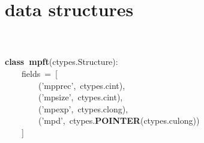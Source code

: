 \documentclass{article}\usepackage[]{graphicx}\usepackage[dvipsnames,table]{xcolor}
\makeatletter
\newcommand{\hlsng}[1]{\textcolor[rgb]{0.192,0.494,0.8}{#1}}%
\newcommand{\hlopt}[1]{\textcolor[rgb]{0,0,0}{#1}}%
\newcommand{\hldef}[1]{\textcolor[rgb]{0.345,0.345,0.345}{#1}}%
\newcommand{\hlkwa}[1]{\textcolor[rgb]{0.161,0.373,0.58}{\textbf{#1}}}%
\newcommand{\hlkwd}[1]{\textcolor[rgb]{0.737,0.353,0.396}{\textbf{#1}}}%
\newenvironment{kframe}{%
 \def\at@end@of@kframe{}%
 \ifinner\ifhmode%
  \def\at@end@of@kframe{\end{minipage}}%
  \begin{minipage}{\columnwidth}%
 \fi\fi%
 \def\FrameCommand##1{\hskip\@totalleftmargin \hskip-\fboxsep
 \colorbox{shadecolor}{##1}\hskip-\fboxsep
     \hskip-\linewidth \hskip-\@totalleftmargin \hskip\columnwidth}%
 \MakeFramed {\advance\hsize-\width
   \@totalleftmargin\z@ \linewidth\hsize
   \@setminipage}}%
 {\par\unskip\endMakeFramed%
 \at@end@of@kframe}
\newenvironment{knitrout}{}{} %
\makeatother
\begin{document}
\section{data structures}
\begin{center}
\begin{minipage}[m]{15cm}
\begin{knitrout}\small
{}\color{fgcolor}\begin{kframe}
\noindent
\ttfamily
\hldef{}\hspace*{\fill}\\
\hldef{}\hspace*{\fill}\\
\hldef{}\hlkwa{class\ }\hldef{}\hlkwd{mpf\textunderscore t}\hldef{}\hlopt{(}\hldef{ctypes}\hlopt{.}\hldef{Structure}\hlopt{):}\hspace*{\fill}\\
\hldef{}\hldef{\ \ \ \ }\hldef{\textunderscore fields\textunderscore \ }\hlopt{=\ {[}}\hspace*{\fill}\\
\hldef{}\hldef{\ \ \ \ \ \ \ \ }\hldef{}\hlopt{(}\hldef{}\hlsng{'\textunderscore mp\textunderscore prec'}\hldef{}\hlopt{,\ }\hldef{ctypes}\hlopt{.}\hldef{c\textunderscore int}\hlopt{),}\hspace*{\fill}\\
\hldef{}\hldef{\ \ \ \ \ \ \ \ }\hldef{}\hlopt{(}\hldef{}\hlsng{'\textunderscore mp\textunderscore size'}\hldef{}\hlopt{,\ }\hldef{ctypes}\hlopt{.}\hldef{c\textunderscore int}\hlopt{),}\hspace*{\fill}\\
\hldef{}\hldef{\ \ \ \ \ \ \ \ }\hldef{}\hlopt{(}\hldef{}\hlsng{'\textunderscore mp\textunderscore exp'}\hldef{}\hlopt{,\ }\hldef{ctypes}\hlopt{.}\hldef{c\textunderscore long}\hlopt{),}\hspace*{\fill}\\
\hldef{}\hldef{\ \ \ \ \ \ \ \ }\hldef{}\hlopt{(}\hldef{}\hlsng{'\textunderscore mp\textunderscore d'}\hldef{}\hlopt{,\ }\hldef{ctypes}\hlopt{.}\hldef{}\hlkwd{POINTER}\hldef{}\hlopt{(}\hldef{ctypes}\hlopt{.}\hldef{c\textunderscore ulong}\hlopt{))}\hspace*{\fill}\\
\hldef{}\hldef{\ \ \ \ }\hldef{}\hlopt{{]}}\hspace*{\fill}\\

\end{kframe}
\end{knitrout}
\end{minipage}
\end{center}
\end{document}

